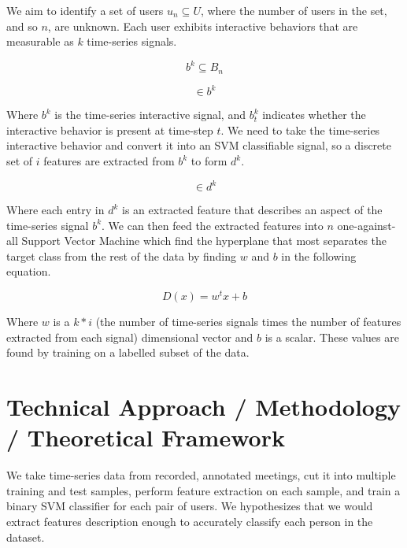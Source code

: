 \documentclass[conference]{IEEEtran}
\begin{document}
We aim to identify a set of users $u_n \subseteq U$, where the number of users in the set, and so $n$, are unknown. Each user exhibits interactive behaviors that are measurable as $k$ time-series signals.

\begin{equation}
    b^k \subseteq B_n
\end{equation}

\begin{equation}
    [b^k_{t=0} ... b^k_{t=n}] \in b^k
\end{equation}

Where $b^k$ is the time-series interactive signal, and $b^k_t$ indicates whether the interactive behavior is present at time-step $t$. We need to take the time-series interactive behavior and convert it into an SVM classifiable signal, so a discrete set of $i$ features are extracted from $b^k$ to form $d^k$.

\begin{equation}
    [d^k_0 ... d^k_i] \in d^k
\end{equation}

Where each entry in $d^k$ is an extracted feature that describes an aspect of the time-series signal $b^k$. We can then feed the extracted features into $n$ one-against-all Support Vector Machine which find the hyperplane that most separates the target class from the rest of the data by finding $w$ and $b$ in the following equation. \cite{abe_analysis_2003}

\begin{equation}
    D(x) = w^tx + b
\end{equation}

Where $w$ is a $k*i$ (the number of time-series signals times the number of features extracted from each signal) dimensional vector and $b$ is a scalar. These values are found by training on a labelled subset of the data. 

\section{Technical Approach / Methodology / Theoretical Framework}\label{formalization}

We take time-series data from recorded, annotated meetings, cut it into multiple training and test samples, perform feature extraction on each sample, and train a binary SVM classifier for each pair of users. We hypothesizes that we would extract features description enough to accurately classify each person in the dataset. 
\end{document}
